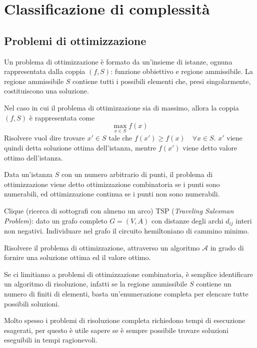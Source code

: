 \documentclass[../template]{subfiles}
\begin{document}
\section{Classificazione di complessità}
\subsection{Problemi di ottimizzazione}
Un problema di ottimizzazione è formato da un'insieme di istanze, ognuna rappresentata dalla coppia $(f, S)$: funzione obbiettivo e regione ammissibile.
La regione ammissibile $S$ contiene tutti i possibili elementi che, presi singolarmente, costituiscono una soluzione.

Nel caso in cui il problema di ottimizzazione sia di massimo, allora la coppia $(f, S)$ è rappresentata come
\[
    \max_{x\in S} f(x)
\]
Risolvere vuol dire trovare $x' \in S$ tale che $f(x') \ge f(x) \quad \forall x \in S$.
$x'$ viene quindi detta soluzione ottima dell'istanza, mentre $f(x')$ viene detto valore ottimo dell'istanza.

Data un'istanza $S$ con un numero arbitrario di punti, il problema di ottimizzazione viene detto ottimizzazione combinatoria se i punti sono numerabili, ed ottimizzazione continua se i punti non sono numerabili.

Clique (ricerca di sottografi con almeno un arco)
TSP (\textit{Traveling Salesman Problem}): dato un grafo completo $G=(V, A)$ con distanze degli archi $d_{ij}$ interi non negativi. Individuare nel grafo il circuito hemiltoniano di cammino minimo.

Risolvere il problema di ottimizzazione, attraverso un algoritmo $\mathcal{A}$ in grado di fornire una soluzione ottima ed il valore ottimo.

Se ci limitiamo a problemi di ottimizzazione combinatoria, è semplice identificare un algoritmo di risoluzione, infatti se la regione ammissibile $S$ contiene un numero di finiti di elementi, basta un'enumerazione completa per elencare tutte possibili soluzioni.

Molto spesso i problemi di risoluzione completa richiedono tempi di esecuzione esagerati, per questo è utile sapere se è sempre possibile trovare soluzioni eseguibili in tempi ragionevoli.
\end{document}
